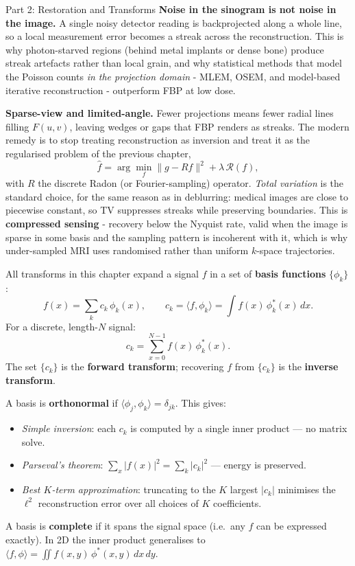 \documentclass[letterpaper]{article}
\begin{document}
\begin{notes}{Part 2: Restoration and Transforms}
\textbf{Noise in the sinogram is not noise in the image.} A single noisy detector reading is backprojected along a whole line, so a local measurement error becomes a streak across the reconstruction. This is why photon-starved regions (behind metal implants or dense bone) produce streak artefacts rather than local grain, and why statistical methods that model the Poisson counts \emph{in the projection domain} - MLEM, OSEM, and model-based iterative reconstruction - outperform FBP at low dose.

\textbf{Sparse-view and limited-angle.} Fewer projections means fewer radial lines filling $F(u,v)$, leaving wedges or gaps that FBP renders as streaks. The modern remedy is to stop treating reconstruction as inversion and treat it as the regularised problem of the previous chapter,
$$\hat f = \arg\min_f \|g - Rf\|^2 + \lambda\,\mathcal{R}(f),$$
with $R$ the discrete Radon (or Fourier-sampling) operator. \emph{Total variation} is the standard choice, for the same reason as in deblurring: medical images are close to piecewise constant, so TV suppresses streaks while preserving boundaries. This is \textbf{compressed sensing} - recovery below the Nyquist rate, valid when the image is sparse in some basis and the sampling pattern is incoherent with it, which is why under-sampled MRI uses randomised rather than uniform $k$-space trajectories.

\columnbreaknofill





All transforms in this chapter expand a signal $f$ in a set of \textbf{basis functions} $\{\phi_k\}$:
$$f(x) = \sum_k c_k\,\phi_k(x), \qquad c_k = \langle f,\phi_k\rangle = \int f(x)\,\phi_k^*(x)\,dx.$$
For a discrete, length-$N$ signal: 
$$c_k = \sum_{x=0}^{N-1} f(x)\,\phi_k^*(x).$$
The set $\{c_k\}$ is the \textbf{forward transform}; recovering $f$ from $\{c_k\}$ is the \textbf{inverse transform}.


A basis is \textbf{orthonormal} if $\langle\phi_j,\phi_k\rangle = \delta_{jk}$. This gives:
\begin{itemize}
    \item \emph{Simple inversion}: each $c_k$ is computed by a single inner product — no matrix solve.
    \item \emph{Parseval's theorem}: $\sum_x|f(x)|^2 = \sum_k|c_k|^2$ — energy is preserved.
    \item \emph{Best $K$-term approximation}: truncating to the $K$ largest $|c_k|$ minimises the $\ell^2$ reconstruction error over all choices of $K$ coefficients.
\end{itemize}
A basis is \textbf{complete} if it spans the signal space (i.e.\ any $f$ can be expressed exactly). In 2D the inner product generalises to $\langle f,\phi\rangle = \iint f(x,y)\,\phi^*(x,y)\,dx\,dy$.


\end{notes}
\end{document}

